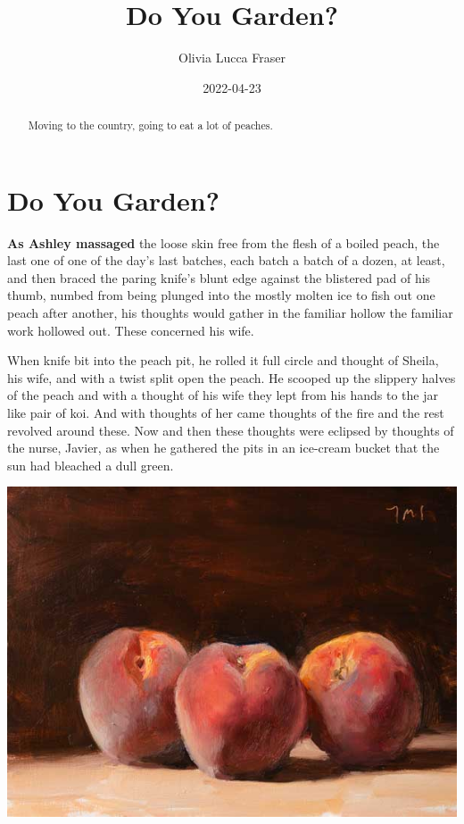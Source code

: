 \documentclass[
]{article}
\title{Do You Garden?}
\author{Olivia Lucca Fraser}
\date{2022-04-23}
\begin{document}
\maketitle
\begin{abstract}
Moving to the country, going to eat a lot of peaches.
\end{abstract}

\hypertarget{do-you-garden}{%
\section{Do You Garden?}\label{do-you-garden}}

\textbf{As Ashley massaged} the loose skin free from the flesh of a
boiled peach, the last one of one of the day's last batches, each batch
a batch of a dozen, at least, and then braced the paring knife's blunt
edge against the blistered pad of his thumb, numbed from being plunged
into the mostly molten ice to fish out one peach after another, his
thoughts would gather in the familiar hollow the familiar work hollowed
out. These concerned his wife.

When knife bit into the peach pit, he rolled it full circle and thought
of Sheila, his wife, and with a twist split open the peach. He scooped
up the slippery halves of the peach and with a thought of his wife they
lept from his hands to the jar like pair of koi. And with thoughts of
her came thoughts of the fire and the rest revolved around these. Now
and then these thoughts were eclipsed by thoughts of the nurse, Javier,
as when he gathered the pits in an ice-cream bucket that the sun had
bleached a dull green.

\includegraphics{../img/peaches.jpg}
\end{document}
